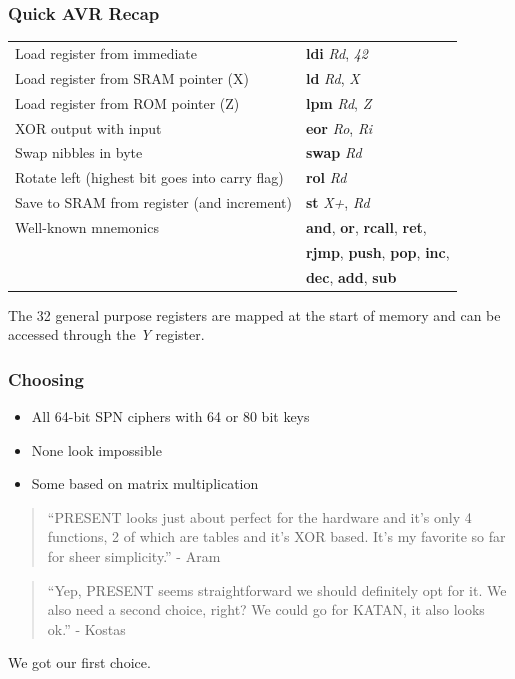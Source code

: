\documentclass{beamer}
\begin{document}
\begin{frame}[fragile]
\frametitle{Quick AVR Recap}
\begin{footnotesize}
\begin{tabular}{l l}
Load register from immediate & \textbf{ldi} \textit{Rd}, \textit{42} \\
Load register from SRAM pointer (X) & \textbf{ld} \textit{Rd}, \textit{X} \\
Load register from ROM pointer (Z) & \textbf{lpm} \textit{Rd}, \textit{Z} \\
XOR output with input & \textbf{eor} \textit{Ro}, \textit{Ri} \\
Swap nibbles in byte & \textbf{swap} \textit{Rd} \\
Rotate left (highest bit goes into carry flag) & \textbf{rol} \textit{Rd} \\
Save to SRAM from register (and increment) & \textbf{st} \textit{X+}, \textit{Rd} \\
Well-known mnemonics & \textbf{and}, \textbf{or}, \textbf{rcall}, \textbf{ret}, \\
                     & \textbf{rjmp}, \textbf{push}, \textbf{pop}, \textbf{inc}, \\
                     & \textbf{dec}, \textbf{add}, \textbf{sub} \\
\end{tabular}
\end{footnotesize}

The 32 general purpose registers are mapped at the start of memory and can be accessed through the \textit{Y} register.
\end{frame}

\begin{frame}[fragile]
\frametitle{Choosing}
\begin{itemize}
\item All 64-bit SPN ciphers with 64 or 80 bit keys
\item None look impossible
\item Some based on matrix multiplication
\end{itemize}
\begin{quote}
``PRESENT looks just about perfect for the hardware and it's only 4
functions, 2 of which are tables and it's XOR based. It's my favorite
so far for sheer simplicity.'' - Aram
\end{quote}

\begin{quote}
``Yep, PRESENT seems straightforward we should definitely opt for it.
We also need a second choice, right? We could go for KATAN, it also looks ok.'' - Kostas
\end{quote}
We got our first choice.
\end{frame}
\end{document}

